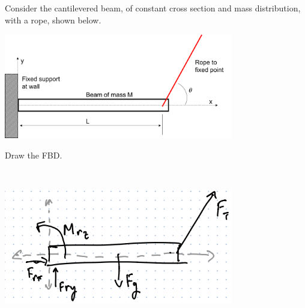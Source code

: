 Consider the cantilevered beam, of constant cross section
and mass distribution, with a rope, shown below.

\begin{center}
    \includegraphics[width=0.75\textwidth]{img/fig24_5.png}
\end{center}

Draw the FBD.

\begin{solution}\
    \begin{center}
        \includegraphics[width=0.75\textwidth]{img/e6p1.png}
    \end{center}
\end{solution}

